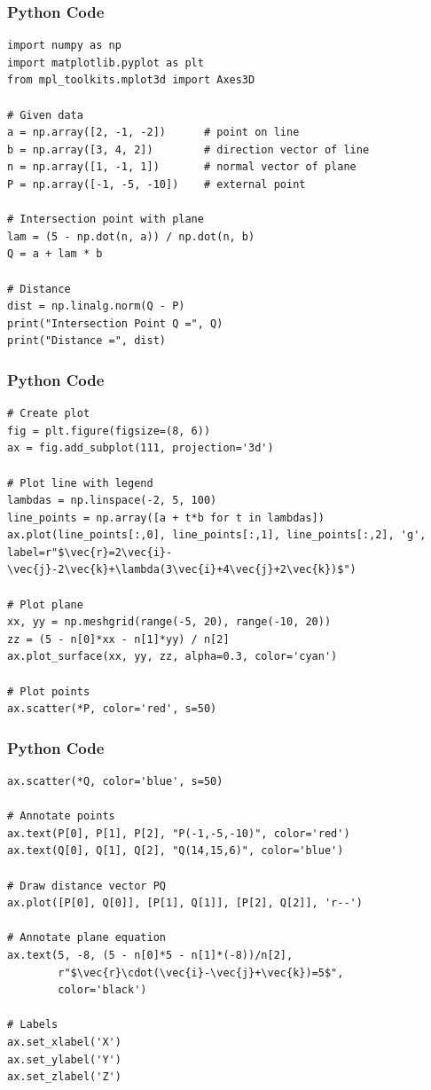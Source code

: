 \documentclass{beamer}
\begin{document}
\begin{frame}[fragile]
    \frametitle{Python Code}
\begin{lstlisting}
import numpy as np
import matplotlib.pyplot as plt
from mpl_toolkits.mplot3d import Axes3D

# Given data
a = np.array([2, -1, -2])      # point on line
b = np.array([3, 4, 2])        # direction vector of line
n = np.array([1, -1, 1])       # normal vector of plane
P = np.array([-1, -5, -10])    # external point

# Intersection point with plane
lam = (5 - np.dot(n, a)) / np.dot(n, b)
Q = a + lam * b

# Distance
dist = np.linalg.norm(Q - P)
print("Intersection Point Q =", Q)
print("Distance =", dist)
\end{lstlisting}
\end{frame}

\begin{frame}[fragile]
    \frametitle{Python Code}
\begin{lstlisting}
# Create plot
fig = plt.figure(figsize=(8, 6))
ax = fig.add_subplot(111, projection='3d')

# Plot line with legend
lambdas = np.linspace(-2, 5, 100)
line_points = np.array([a + t*b for t in lambdas])
ax.plot(line_points[:,0], line_points[:,1], line_points[:,2], 'g', label=r"$\vec{r}=2\vec{i}-\vec{j}-2\vec{k}+\lambda(3\vec{i}+4\vec{j}+2\vec{k})$")

# Plot plane
xx, yy = np.meshgrid(range(-5, 20), range(-10, 20))
zz = (5 - n[0]*xx - n[1]*yy) / n[2]
ax.plot_surface(xx, yy, zz, alpha=0.3, color='cyan')

# Plot points
ax.scatter(*P, color='red', s=50)
\end{lstlisting}
\end{frame}

\begin{frame}[fragile]
    \frametitle{Python Code}
\begin{lstlisting}
ax.scatter(*Q, color='blue', s=50)

# Annotate points
ax.text(P[0], P[1], P[2], "P(-1,-5,-10)", color='red')
ax.text(Q[0], Q[1], Q[2], "Q(14,15,6)", color='blue')

# Draw distance vector PQ
ax.plot([P[0], Q[0]], [P[1], Q[1]], [P[2], Q[2]], 'r--')

# Annotate plane equation
ax.text(5, -8, (5 - n[0]*5 - n[1]*(-8))/n[2],
        r"$\vec{r}\cdot(\vec{i}-\vec{j}+\vec{k})=5$",
        color='black')

# Labels
ax.set_xlabel('X')
ax.set_ylabel('Y')
ax.set_zlabel('Z')
\end{lstlisting}
\end{frame}
\end{document}

